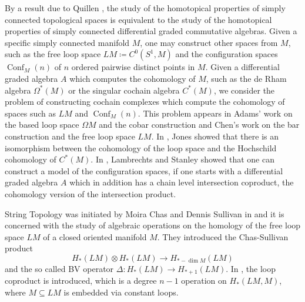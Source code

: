 \documentclass{scrartcl}
\theoremstyle{plain}
\theoremstyle{definition}
\renewcommand{\subset}{\subseteq}
\newcommand{\defeq}{\coloneqq}
\DeclareMathOperator{\Conf}{Conf}
\begin{document}
By a result due to Quillen \cite{quillen1969rational}, the study of the homotopical properties of simply connected topological spaces is equivalent to the study of the homotopical properties of simply connected differential graded commutative algebras. Given a specific simply connected manifold $M$, one may construct other spaces from $M$, such as the free loop space $LM \defeq C^0(S^1, M)$ and the configuration spaces $\Conf_M(n)$ of $n$ ordered pairwise distinct points in $M$. Given a differential graded algebra $A$ which computes the cohomology of $M$, such as the de Rham algebra $\Omega^*(M)$ or the singular cochain algebra $C^*(M)$, we consider the problem of constructing cochain complexes which compute the cohomology of spaces such as $LM$ and $\Conf_M(n)$. This problem appears in Adams' work on the based loop space $\Omega M$ and the cobar construction \cite{adams1956cobar} and Chen's work \cite{chen1977iterated} on the bar construction and the free loop space $LM$. In \cite{jones1987cyclic}, Jones showed that there is an isomorphism between the cohomology of the loop space and the Hochschild cohomology of $C^*(M)$. In \cite{lambrechts2008remarkable}, Lambrechts and Stanley showed that one can construct a model of the configuration spaces, if one starts with a differential graded algebra $A$ which in addition has a chain level intersection coproduct, the cohomology version of the intersection product.

String Topology was initiated by Moira Chas and Dennis Sullivan in \cite{chas1999string} and it is concerned with the study of algebraic operations on the homology of the free loop space $LM$ of a closed oriented manifold $M$. They introduced the Chas-Sullivan product $$H_*(LM)\otimes H_*(LM)\to H_{*-\dim M}(LM)$$ and the so called BV operator $\Delta\colon H_*(LM)\to H_{*+1}(LM)$. In \cite{Goresky_2009}, the loop coproduct is introduced, which is a degree $n-1$ operation on $H_*(LM, M)$, where $M\subset LM$ is embedded via constant loops.
\end{document}
